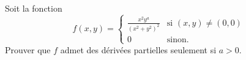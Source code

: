 
\begin{exercice}\label{exoMaximisation-0001}

	Soit la fonction 
	\begin{equation}
		f(x,y)=\begin{cases}
			\frac{ x^2y^a }{ (x^2+y^2)^2 }	&	\text{si }(x,y)\neq(0,0)\\
			0	&	 \text{sinon}.
		\end{cases}
	\end{equation}
	Prouver que $f$ admet des dérivées partielles seulement si $a>0$.

\end{exercice}
